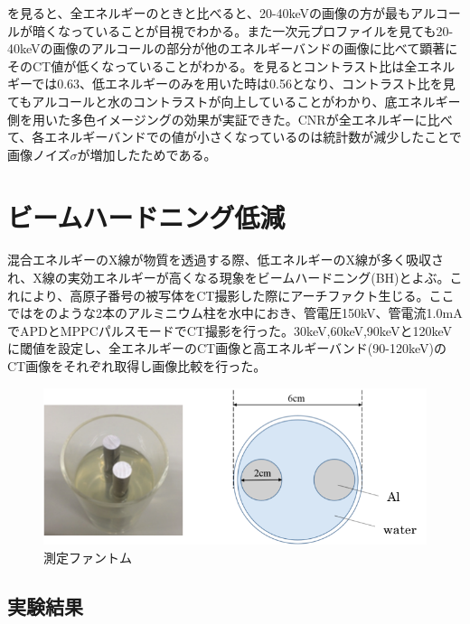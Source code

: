 を見ると、全エネルギーのときと比べると、20-40keVの画像の方が最もアルコールが暗くなっていることが目視でわかる。また一次元プロファイルを見ても20-40keVの画像のアルコールの部分が他のエネルギーバンドの画像に比べて顕著にそのCT値が低くなっていることがわかる。を見るとコントラスト比は全エネルギーでは0.63、低エネルギーのみを用いた時は0.56となり、コントラスト比を見てもアルコールと水のコントラストが向上していることがわかり、底エネルギー側を用いた多色イメージングの効果が実証できた。CNRが全エネルギーに比べて、各エネルギーバンドでの値が小さくなっているのは統計数が減少したことで画像ノイズ$\sigma$が増加したためである。

\section{ビームハードニング低減}
混合エネルギーのX線が物質を透過する際、低エネルギーのX線が多く吸収され、X線の実効エネルギーが高くなる現象をビームハードニング(BH)とよぶ。これにより、高原子番号の被写体をCT撮影した際にアーチファクト生じる。ここではをのような2本のアルミニウム柱を水中におき、管電圧150kV、管電流1.0mAでAPDとMPPCパルスモードでCT撮影を行った。30keV,60keV,90keVと120keVに閾値を設定し、全エネルギーのCT画像と高エネルギーバンド(90-120keV)のCT画像をそれぞれ取得し画像比較を行った。

\begin{figure}[H]
 \begin{center}
 \includegraphics[bb=0.000000 0.000000 324.453179 132.949010,width=0.7\hsize]{image2/chapter5/Al_Al.png} 
 \end{center}
 \caption{測定ファントム}
 \label{fig:Al_Al}
\end{figure}

\subsection{実験結果}


